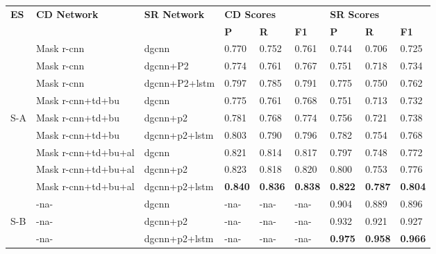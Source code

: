 \documentclass[runningheads]{llncs}
\begin{document}
\begin{table}
\vspace{-1em}
\end{table}

\begin{table}\addtolength{\tabcolsep}{-1.0pt}
\begin{center}
\begin{tabular}{|l|l |l |l l l| l l l|} \hline
\textbf{ES} &\textbf{CD Network} & \textbf{SR Network} &\multicolumn{3}{l|}{\textbf{CD Scores}} &\multicolumn{3}{l|}{\textbf{SR Scores}} \\ \cline{4-9}
 &  &   &\textbf{P} &\textbf{R} &\textbf{F1} &\textbf{P} &\textbf{R} &\textbf{F1} \\ \hline
&Mask {\sc r-cnn} &{\sc dgcnn} &0.770 &0.752 &0.761 &0.744 &0.706 &0.725 \\
&Mask {\sc r-cnn} &{\sc dgcnn}+P2 &0.774 &0.761	&0.767 &0.751 &0.718 &0.734 \\
&Mask {\sc r-cnn} &{\sc dgcnn}+P2+{\sc lstm} &0.797	&0.785 &0.791 &0.775 &0.750 &0.762 \\ \cline{2-9}
&Mask {\sc r-cnn}+{\sc td}+{\sc bu} &{\sc dgcnn} &0.775	&0.761 &0.768 &0.751 &0.713	&0.732 \\
S-A &Mask {\sc r-cnn}+{\sc td}+{\sc bu} &{\sc dgcnn}+{\sc p}2 &0.781 &0.768	&0.774 &0.756 &0.721 &0.738 \\ 
&Mask {\sc r-cnn}+{\sc td}+{\sc bu}	&{\sc dgcnn}+{\sc p}2+{\sc lstm} &0.803	&0.790 &0.796 &0.782 &0.754 &0.768 \\ \cline{2-9}
&Mask {\sc r-cnn}+{\sc td}+{\sc bu}+{\sc al} &{\sc dgcnn} &0.821 &0.814	&0.817 &0.797 &0.748 &0.772\\	
&Mask {\sc r-cnn}+{\sc td}+{\sc bu}+{\sc al} &{\sc dgcnn}+{\sc p}2 &0.823 &0.818 &0.820 &0.800 &0.753	&0.776 \\
&Mask {\sc r-cnn}+{\sc td}+{\sc bu}+{\sc al} &{\sc dgcnn}+{\sc p}2+{\sc lstm} &\textbf{0.840} &\textbf{0.836}	&\textbf{0.838} &\textbf{0.822}	&\textbf{0.787} &\textbf{0.804} \\ \hline
 & -{\sc na}- &{\sc dgcnn} & -{\sc na}- & -{\sc na}-  & -{\sc na}- &0.904 &0.889 &0.896 \\ 
S-B & -{\sc na}- &{\sc dgcnn}+{\sc p}2  & -{\sc na}- & -{\sc na}- & -{\sc na}- &0.932 &0.921 &0.927 \\
  & -{\sc na}-  &{\sc dgcnn}+{\sc p}2+{\sc lstm} & -{\sc na}- & -{\sc na}- & -{\sc na}- &\textbf{0.975} &\textbf{0.958} &\textbf{0.966} \\ \hline 
\end{tabular}
\end{center}

\end{table}
\end{document}
